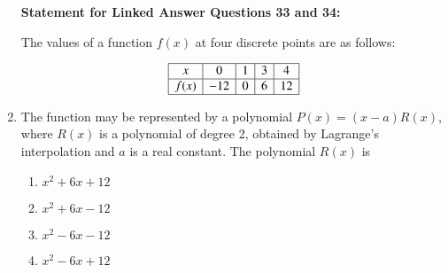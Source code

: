 \documentclass[journal,12pt,onecolumn]{IEEEtran}
\theoremstyle{remark}
\begin{document}
\begin{enumerate}
\textbf{Statement for Linked Answer Questions 33 and 34:}

The values of a function $f(x)$ at four discrete points are as follows:

\[
\begin{array}{|c|c|c|c|c|}
\hline
x & 0 & 1 & 3 & 4 \\
\hline
f(x) & -12 & 0 & 6 & 12 \\
\hline
\end{array}
\]
\item The function may be represented by a polynomial $P(x) = (x - a)R(x)$, where $R(x)$ is a polynomial of degree 2, obtained by Lagrange's interpolation and $a$ is a real constant. The polynomial $R(x)$ is

\begin{multicols}{4}
\begin{enumerate}
    \item $x^2 + 6x + 12$
    \item $x^2 + 6x - 12$
    \item $x^2 - 6x - 12$
    \item $x^2 - 6x + 12$
\end{enumerate}
\end{multicols}
\end{enumerate}
\end{document}
